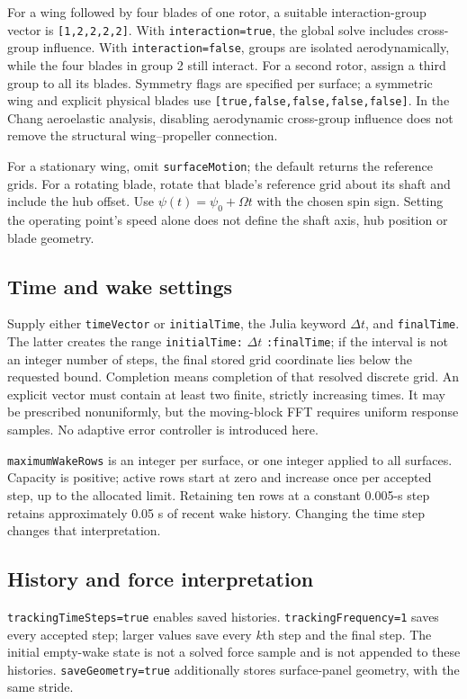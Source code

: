 \documentclass[11pt,a4paper]{article}
\newcommand{\code}{\nolinkurl}
\begin{document}
For a wing followed by four blades of one rotor, a suitable interaction-group
vector is \code{[1,2,2,2,2]}. With \code{interaction=true}, the global solve
includes cross-group influence. With \code{interaction=false}, groups are
isolated aerodynamically, while the four blades in group 2 still interact.
For a second rotor, assign a third group to all its blades. Symmetry flags are
specified per surface; a symmetric wing and explicit physical blades use
\code{[true,false,false,false,false]}. In the Chang aeroelastic analysis,
disabling aerodynamic cross-group influence does not remove the structural
wing--propeller connection.

For a stationary wing, omit \code{surfaceMotion}; the default returns the
reference grids. For a rotating blade, rotate that blade's reference grid about
its shaft and include the hub offset. Use $\psi(t)=\psi_0+\Omega t$ with the
chosen spin sign. Setting the operating point's speed alone does not define
the shaft axis, hub position or blade geometry.

\subsection{Time and wake settings}
Supply either \code{timeVector} or \code{initialTime}, the Julia keyword
$\Delta t$, and \code{finalTime}. The latter creates the range
\code{initialTime:} $\Delta t$ \code{:finalTime}; if the interval is not an
integer number of steps, the final stored grid coordinate lies below the
requested bound. Completion means completion of that resolved discrete grid.
An explicit vector must contain at least two finite, strictly increasing times.
It may be prescribed nonuniformly, but the moving-block FFT requires uniform
response samples. No adaptive error controller is introduced here.

\code{maximumWakeRows} is an integer per surface, or one integer applied to
all surfaces. Capacity is positive; active rows start at zero and increase
once per accepted step, up to the allocated limit. Retaining ten rows at a
constant 0.005-s step retains approximately 0.05 s of recent wake history.
Changing the time step changes that interpretation.

\subsection{History and force interpretation}
\code{trackingTimeSteps=true} enables saved histories.
\code{trackingFrequency=1} saves every accepted step; larger values save every
$k$th step and the final step. The initial empty-wake state is not a solved
force sample and is not appended to these histories. \code{saveGeometry=true}
additionally stores surface-panel geometry, with the same stride.
\end{document}
